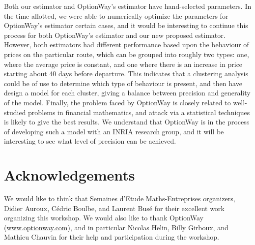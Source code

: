 \documentclass{article}
\begin{document}
Both our estimator and OptionWay's estimator have hand-selected
parameters.  In the time allotted, we were able to numerically
optimize the parameters for OptionWay's estimator certain cases, and
it would be interesting to continue this process for both OptionWay's
estimator and our new proposed estimator.  However, both estimators
had different performance based upon the behaviour of prices on the
particular route, which can be grouped into roughly two types: one,
where the average price is constant, and one where there is an
increase in price starting about 40 days before departure.  This
indicates that a clustering analysis could be of use to determine
which type of behaviour is present, and then have design a model for
each cluster, giving a balance between precision and generality of the
model.  Finally, the problem faced by OptionWay is closely related to
well-studied problems in financial mathematics, and attack via a
statistical techniques is likely to give the best results.  We
understand that OptionWay is in the process of developing such a model
with an INRIA research group, and it will be interesting to see what level
of precision can be achieved.

\section*{Acknowledgements}
  We would like to think that Semaines d'Etude Maths-Entreprises
  organizers, Didier Auroux, C\'edric Boulbe, and Laurent Busé for
  their excellent work organizing this workshop.  We would also like
  to thank OptionWay (\url{www.optionway.com}), and in
  particular Nicolas Helin, Billy Girboux, and Mathieu Chauvin for
  their help and participation during the workshop.
\end{document}
